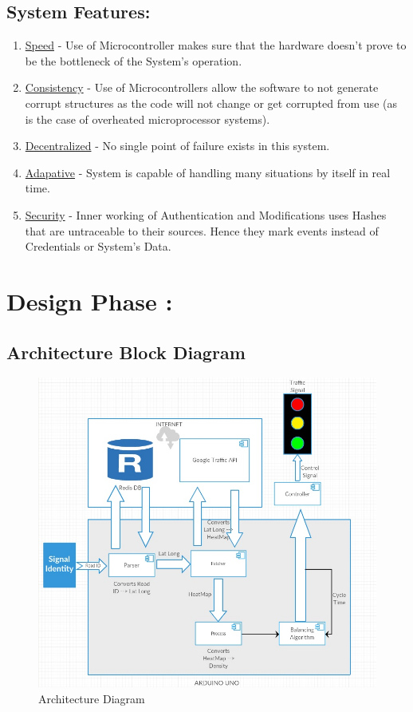 \documentclass[12pt,a4paper,final]{report}
\begin{document}
\subsection{System Features:}
	\begin{enumerate}
		\item \underline{Speed} - Use of Microcontroller makes sure that the hardware doesn't prove to be the bottleneck of the System's operation.
		\item \underline{Consistency} - Use of Microcontrollers allow the software to not generate corrupt structures as the code will not change or get corrupted from use (as is the case of overheated microprocessor systems).
		\item \underline{Decentralized} - No single point of failure exists in this system.
		\item \underline{Adapative} - System is capable of handling many situations by itself in real time.
		\item \underline{Security} - Inner working of Authentication and Modifications uses Hashes that are untraceable to their sources. Hence they mark events instead of Credentials or System's Data.
	\end{enumerate}
\newpage

\section{Design Phase :}
\subsection{Architecture Block Diagram}
	\begin{figure}[!h]
		\begin{center}
			\includegraphics[scale=0.5]{Diagrams/Architecture_Diagram.jpg}
		\end{center}
		\caption{Architecture Diagram}
	\end{figure}
	
\end{document}
